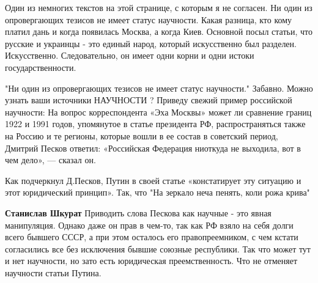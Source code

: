 \begin{itemize}
 

Один из немногих текстов на этой странице, с которым я не согласен. Ни один из
опровергающих тезисов не имеет статус научности. Какая разница, кто кому платил
дань и когда появилась Москва, а когда Киев. Основной посыл статьи, что русские
и украинцы - это единый народ, который искусственно был разделен. Искусственно.
Следовательно, он имеет одни корни и одни истоки государственности.

\begin{itemize}
 

"Ни один из опровергающих тезисов не имеет статус научности." Забавно. Можно
узнать ваши источники НАУЧНОСТИ ? Приведу свежий пример российской научности:
На вопрос корреспондента «Эха Москвы» может ли сравнение границ 1922 и 1991
годов, упомянутое в статье президента РФ, распространяться также на Россию и те
регионы, которые вошли в ее состав в советский период, Дмитрий Песков ответил:
«Российская Федерация ниоткуда не выходила, вот в чем дело», — сказал он.

Как подчеркнул Д.Песков, Путин в своей статье «констатирует эту ситуацию и этот
юридический принцип». Так, что "На зеркало неча пенять, коли рожа крива"


 

\textbf{Станислав Шкурат} Приводить слова Пескова как научные - это явная манипуляция.
Однако даже он прав в чем-то, так как РФ взяло на себя долги всего бывшего
СССР, а при этом осталось его правопреемником, с чем кстати согласились все без
исключения бывшие союзные республики. Так что может тут и нет научности, но
зато есть юридическая преемственность. Что не отменяет научности статьи Путина.

 

\end{itemize}
\end{itemize}
